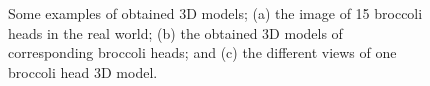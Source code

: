 \begin{figure}[htb!]
  \begin{center}
  \end{center}
  \caption[The obtained 3D models]{
    Some examples of obtained 3D models; (a) the image of 15 broccoli heads in the real world; (b) the obtained 3D models of corresponding broccoli heads; and (c) the different views of one broccoli head 3D model.
  }
  \label{fig:des_model_results}
\end{figure}